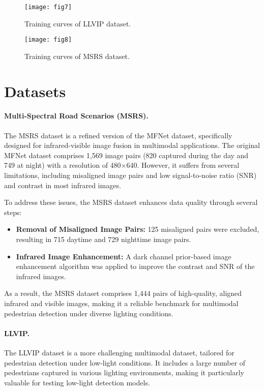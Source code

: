 \begin{figure}[h]
    \centering
    \texttt{[image: fig7]}
    \caption{Training curves of LLVIP dataset.}
    \label{fig:fig_llvip}
    \texttt{[image: fig8]}
    \caption{Training curves of MSRS dataset.}
    \label{fig:fig_msrs}
\end{figure}




\section{Datasets}


\paragraph{Multi-Spectral Road Scenarios (MSRS).}
The MSRS dataset is a refined version of the MFNet dataset, specifically designed for infrared-visible image fusion in multimodal applications. The original MFNet dataset comprises 1,569 image pairs (820 captured during the day and 749 at night) with a resolution of 480$\times$640. However, it suffers from several limitations, including misaligned image pairs and low signal-to-noise ratio (SNR) and contrast in most infrared images.

To address these issues, the MSRS dataset enhances data quality through several steps:
\begin{itemize}
	\item \textbf{Removal of Misaligned Image Pairs:} 125 misaligned pairs were excluded, resulting in 715 daytime and 729 nighttime image pairs.
	\item \textbf{Infrared Image Enhancement:} A dark channel prior-based image enhancement algorithm was applied to improve the contrast and SNR of the infrared images.
\end{itemize}

As a result, the MSRS dataset comprises 1,444 pairs of high-quality, aligned infrared and visible images, making it a reliable benchmark for multimodal pedestrian detection under diverse lighting conditions.

\paragraph{LLVIP.}
The LLVIP dataset is a more challenging multimodal dataset, tailored for pedestrian detection under low-light conditions. It includes a large number of pedestrians captured in various lighting environments, making it particularly valuable for testing low-light detection models.

